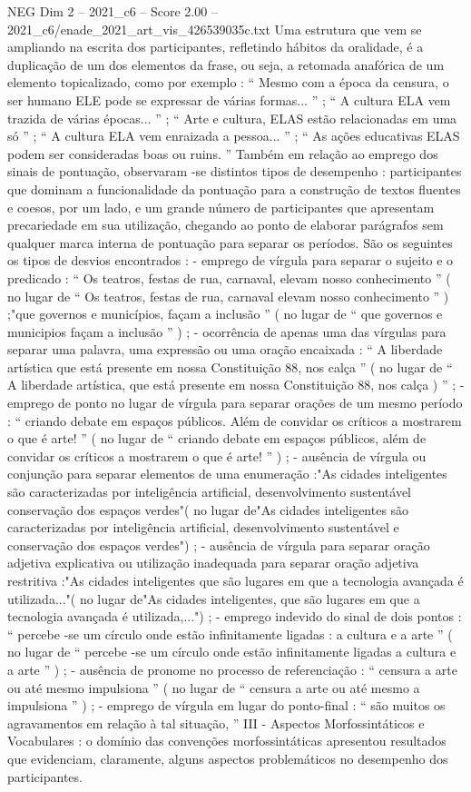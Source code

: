 \begin{textsample}{NEG Dim 2 – 2021\_c6 – Score 2.00 – 2021\_c6/enade\_2021\_art\_vis\_426539035c.txt}
Uma estrutura que vem se ampliando na escrita dos participantes, refletindo hábitos da oralidade, é a duplicação de um dos elementos da frase, ou seja, a retomada anafórica de um elemento topicalizado, como por exemplo : “ Mesmo com a época da censura, o ser humano ELE pode se expressar de várias formas... ” ; “ A cultura ELA vem trazida de várias épocas... ” ; “ Arte e cultura, ELAS estão relacionadas em uma só ” ; “ A cultura ELA vem enraizada a pessoa... ” ; “ As ações educativas ELAS podem ser consideradas boas ou ruins. ” Também em relação ao emprego dos sinais de pontuação, observaram -se distintos tipos de desempenho : participantes que dominam a funcionalidade da pontuação para a construção de textos fluentes e coesos, por um lado, e um grande número de participantes que apresentam precariedade em sua utilização, chegando ao ponto de elaborar parágrafos sem qualquer marca interna de pontuação para separar os períodos.
São os seguintes os tipos de desvios encontrados : - emprego de vírgula para separar o sujeito e o predicado : “ Os teatros, festas de rua, carnaval, elevam nosso conhecimento ” ( no lugar de “ Os teatros, festas de rua, carnaval elevam nosso conhecimento ” ) ;"que governos e municípios, façam a inclusão ” ( no lugar de “ que governos e municipios façam a inclusão ” ) ; - ocorrência de apenas uma das vírgulas para separar uma palavra, uma expressão ou uma oração encaixada : “ A liberdade artística que está presente em nossa Constituição 88, nos calça ” ( no lugar de “ A liberdade artística, que está presente em nossa Constituição 88, nos calça ) ” ; - emprego de ponto no lugar de vírgula para separar orações de um mesmo período : “ criando debate em espaços públicos.
Além de convidar os críticos a mostrarem o que é arte! ” ( no lugar de “ criando debate em espaços públicos, além de convidar os críticos a mostrarem o que é arte! ” ) ; - ausência de vírgula ou conjunção para separar elementos de uma enumeração :"As cidades inteligentes são caracterizadas por inteligência artificial, desenvolvimento sustentável conservação dos espaços verdes"( no lugar de"As cidades inteligentes são caracterizadas por inteligência artificial, desenvolvimento sustentável e conservação dos espaços verdes") ; - ausência de vírgula para separar oração adjetiva explicativa ou utilização inadequada para separar oração adjetiva restritiva :"As cidades inteligentes que são lugares em que a tecnologia avançada é utilizada..."( no lugar de"As cidades inteligentes, que são lugares em que a tecnologia avançada é utilizada,...") ; - emprego indevido do sinal de dois pontos : “ percebe -se um círculo onde estão infinitamente ligadas : a cultura e a arte ” ( no lugar de “ percebe -se um círculo onde estão infinitamente ligadas a cultura e a arte ” ) ; - ausência de pronome no processo de referenciação : “ censura a arte ou até mesmo impulsiona ” ( no lugar de “ censura a arte ou até mesmo a impulsiona ” ) ; - emprego de vírgula em lugar do ponto-final : “ são muitos os agravamentos em relação à tal situação, ” III - Aspectos Morfossintáticos e Vocabulares : o domínio das convenções morfossintáticas apresentou resultados que evidenciam, claramente, alguns aspectos problemáticos no desempenho dos participantes.

\end{textsample}
